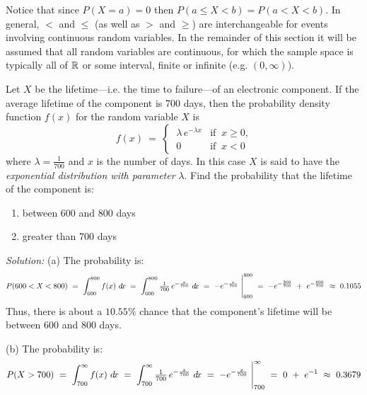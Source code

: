 Notice that since $P(X=a)=0$ then $P(a \le X < b) = P(a < X < b)$. In general,
$<$ and $\le$ (as well as $>$ and $\ge$) are interchangeable for events involving continuous random
variables. In the remainder of this section it will
be assumed that all random variables are continuous, for which the sample space
is typically all of $\mathbb{R}$ or some interval, finite or infinite
(e.g. $(0,\infty)$).
\newpage
\begin{exmp}\label{exmp:expdist}
\noindent Let $X$ be the lifetime---i.e. the time to failure---of an electronic
component. If the average lifetime of the  component is 700 days, then the
probability density function $f(x)$ for the random variable $X$
is
\begin{equation}\label{eqn:expdist}
f(x) ~=~ \begin{cases} ~\lambda\,e^{-\lambda x}& \text{if $~x \ge 0$,}\\~0 & \text{if $~x<0$}\end{cases}
\end{equation}
where $\lambda = \frac{1}{700}$ and $x$ is the number of days. In this case $X$
is said to have the \emph{exponential distribution with parameter} $\lambda$.
Find the probability that the lifetime of the component is:
\begin{enumerate}[\bfseries (a)]
\item between 600 and 800 days
\item greater than 700 days
\end{enumerate}
\par\noindent\emph{Solution:} (a) The probability is:
\[
P(600 < X < 800) ~=~ \int_{600}^{800} f(x)~d\!x ~=~ \int_{600}^{800} \tfrac{1}{700}\,e^{-\frac{x}{700}}~d\!x
~=~ -e^{-\frac{x}{700}}~\Biggr|_{600}^{800} ~=~ -e^{-\frac{800}{700}} ~+~ e^{-\frac{600}{700}} ~\approx~ 0.1055
\]
Thus, there is about a $10.55\%$ chance that the component's lifetime will be
between 600 and 800 days.
\par\noindent (b) The probability is:
\[
P(X > 700) ~=~ \int_{700}^{\infty} f(x)~d\!x ~=~ \int_{700}^{\infty} \tfrac{1}{700}\,e^{-\frac{x}{700}}~d\!x
~=~ -e^{-\frac{x}{700}}~\Biggr|_{700}^{\infty} ~=~ 0 ~+~ e^{-1} ~\approx~ 0.3679
\]
\end{exmp}
\divider
\vspace{2mm}

